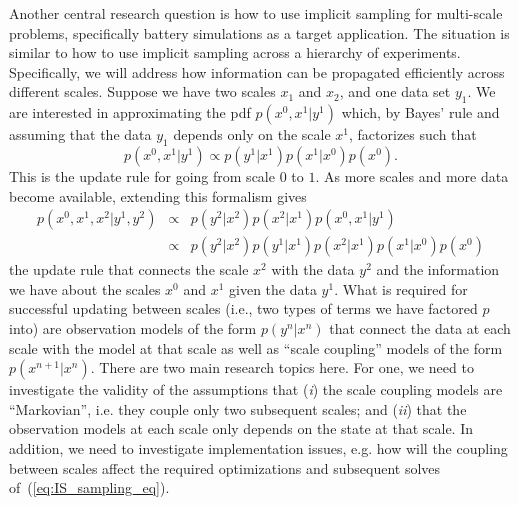 \documentclass[11pt]{article}
\newcommand{\MarginPar}[1]{\marginpar{%
\vskip-\baselineskip %
\raggedright\tiny\sffamily
\hrule\smallskip{\color{red}#1}\par\smallskip\hrule}}
\begin{document}
Another central research question is how to use implicit sampling for multi-scale problems, specifically battery simulations as a target application. The situation is similar to how to use implicit sampling across a hierarchy of experiments. Specifically, we will address how information can be propagated efficiently across different scales. Suppose we have two scales $x_1$ and $x_2$, and one data set $y_1$. We are interested in approximating the pdf $p(x^0, x^1|y^1)$ which, by Bayes' rule and assuming that the data $y_1$ depends only on the scale $x^1$, factorizes such that
\begin{equation}
	p(x^0, x^1|y^1) \propto p(y^1|x^1) p(x^1|x^0) p(x^0).
\end{equation}
This is the update rule for going from scale $0$ to $1$. As more scales and more data become available, extending this formalism gives
\begin{eqnarray}
	p(x^0,x^1,x^2 | y^1,y^2) & \propto  & p(y^2 | x^2) p(x^2|x^1) p(x^0,x^1 | y^1) \\
	  & \propto & p(y^2 | x^2)  p(y^1|x^1)    p(x^2|x^1)p(x^1|x^0) p(x^0)
\end{eqnarray}
the update rule that connects the scale $x^2$ with the data $y^2$ and the information we have about the scales $x^0$ and $x^1$ given the data $y^1$.
What is required for successful updating between scales 
(i.e., two types of terms we have factored $p$ into) are observation models
of the form $p(y^{n}|x^{n})$ that connect the data at each scale with the model at that scale as well as ``scale coupling'' models of the form $p(x^{n+1}|x^n)$.
There are two main research topics here. For one, we need to investigate the validity of the assumptions that (\emph{i}) the scale coupling models are ``Markovian'', i.e. they couple only two subsequent scales; and (\emph{ii}) that the observation models at each scale only depends on the state at that scale.
In addition, we need to investigate implementation issues, e.g. how will the coupling between scales affect the required optimizations and subsequent solves of~(\ref{eq:IS_sampling_eq}).
\MarginPar{Peter: can you check that this makes sense?}
\end{document}
